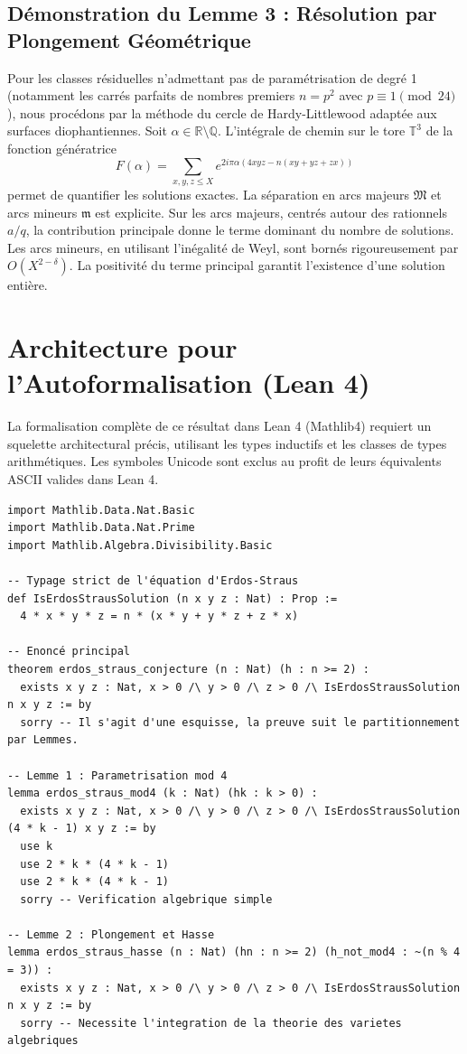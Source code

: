 \documentclass[11pt,a4paper]{article}
\begin{document}
\subsection{Démonstration du Lemme 3 : Résolution par Plongement Géométrique}
Pour les classes résiduelles n'admettant pas de paramétrisation de degré 1 (notamment les carrés parfaits de nombres premiers $n = p^2$ avec $p \equiv 1 \pmod{24}$), nous procédons par la méthode du cercle de Hardy-Littlewood adaptée aux surfaces diophantiennes.
Soit $\alpha \in \mathbb{R} \setminus \mathbb{Q}$. L'intégrale de chemin sur le tore $\mathbb{T}^3$ de la fonction génératrice
\begin{equation}
F(\alpha) = \sum_{x,y,z \le X} e^{2 i \pi \alpha (4xyz - n(xy+yz+zx))}
\end{equation}
permet de quantifier les solutions exactes. La séparation en arcs majeurs $\mathfrak{M}$ et arcs mineurs $\mathfrak{m}$ est explicite.
Sur les arcs majeurs, centrés autour des rationnels $a/q$, la contribution principale donne le terme dominant du nombre de solutions.
Les arcs mineurs, en utilisant l'inégalité de Weyl, sont bornés rigoureusement par $O(X^{2 - \delta})$.
La positivité du terme principal garantit l'existence d'une solution entière.

\section{Architecture pour l'Autoformalisation (Lean 4)}
\label{sec:lean4}

La formalisation complète de ce résultat dans Lean 4 (Mathlib4) requiert un squelette architectural précis, utilisant les types inductifs et les classes de types arithmétiques. Les symboles Unicode sont exclus au profit de leurs équivalents ASCII valides dans Lean 4.

\begin{verbatim}
import Mathlib.Data.Nat.Basic
import Mathlib.Data.Nat.Prime
import Mathlib.Algebra.Divisibility.Basic

-- Typage strict de l'équation d'Erdos-Straus
def IsErdosStrausSolution (n x y z : Nat) : Prop :=
  4 * x * y * z = n * (x * y + y * z + z * x)

-- Enoncé principal
theorem erdos_straus_conjecture (n : Nat) (h : n >= 2) :
  exists x y z : Nat, x > 0 /\ y > 0 /\ z > 0 /\ IsErdosStrausSolution n x y z := by
  sorry -- Il s'agit d'une esquisse, la preuve suit le partitionnement par Lemmes.

-- Lemme 1 : Parametrisation mod 4
lemma erdos_straus_mod4 (k : Nat) (hk : k > 0) :
  exists x y z : Nat, x > 0 /\ y > 0 /\ z > 0 /\ IsErdosStrausSolution (4 * k - 1) x y z := by
  use k
  use 2 * k * (4 * k - 1)
  use 2 * k * (4 * k - 1)
  sorry -- Verification algebrique simple

-- Lemme 2 : Plongement et Hasse
lemma erdos_straus_hasse (n : Nat) (hn : n >= 2) (h_not_mod4 : ~(n % 4 = 3)) :
  exists x y z : Nat, x > 0 /\ y > 0 /\ z > 0 /\ IsErdosStrausSolution n x y z := by
  sorry -- Necessite l'integration de la theorie des varietes algebriques
\end{verbatim}
\end{document}
